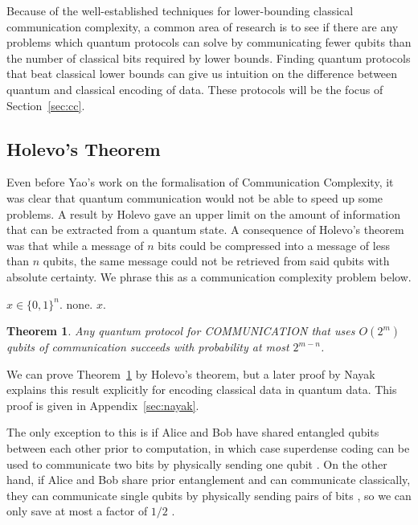 \documentclass[a4paper]{article}
\newtheorem{theorem}{Theorem}[section]
\begin{document}
        Because of the well-established techniques for lower-bounding classical communication complexity, a common area of research is to see if there are any problems which quantum protocols can solve by communicating fewer qubits than the number of classical bits required by lower bounds. Finding quantum protocols that beat classical lower bounds can give us intuition on the difference between quantum and classical encoding of data. These protocols will be the focus of Section~\ref{sec:cc}.

        \subsection{Holevo's Theorem}

        Even before Yao's work on the formalisation of Communication Complexity, it was clear that quantum communication would not be able to speed up some problems. A result by Holevo \cite{Hol73} gave an upper limit on the amount of information that can be extracted from a quantum state. A consequence of Holevo's theorem was that while a message of $n$ bits could be compressed into a message of less than $n$ qubits, the same message could not be retrieved from said qubits with absolute certainty. We phrase this as a communication complexity problem below.

        \begin{codebox}
            \zi {} $x \in \{0, 1\}^n$.
            \zi {} none.
            \zi {} $x$.
        \end{codebox}

        \begin{theorem}
            \label{thm:nayak}
            Any quantum protocol for COMMUNICATION that uses $O(2^m)$ qubits of communication succeeds with probability at most $2^{m-n}$.
        \end{theorem}

        We can prove Theorem~\ref{thm:nayak} by Holevo's theorem, but a later proof by Nayak \cite{814608} explains this result explicitly for encoding classical data in quantum data. This proof is given in Appendix~\ref{sec:nayak}.

        The only exception to this is if Alice and Bob have shared entangled qubits between each other prior to computation, in which case superdense coding can be used to communicate two bits by physically sending one qubit \cite{PhysRevLett.69.2881}. On the other hand, if Alice and Bob share prior entanglement and can communicate classically, they can communicate single qubits by physically sending pairs of bits \cite{PhysRevLett.70.1895}, so we can only save at most a factor of $1/2$ \cite{quant-ph/0101005}.
\end{document}
